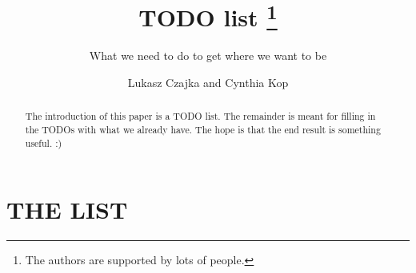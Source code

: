 \documentclass[runningheads,a4paper]{llncs}
\begin{document}
\mainmatter

\title{TODO list
  \thanks{The authors are supported by lots of people.}}
\subtitle{What we need to do to get where we want to be}

\author{Lukasz Czajka and Cynthia Kop}

\maketitle

\begin{abstract}
The introduction of this paper is a TODO list.
The remainder is meant for filling in the TODOs with what we already
have.
The hope is that the end result is something useful. :)
\end{abstract}

\section*{THE LIST}

\renewcommand{\theenumii}{\arabic{enumi}.\arabic{enumii}}
\end{document}
